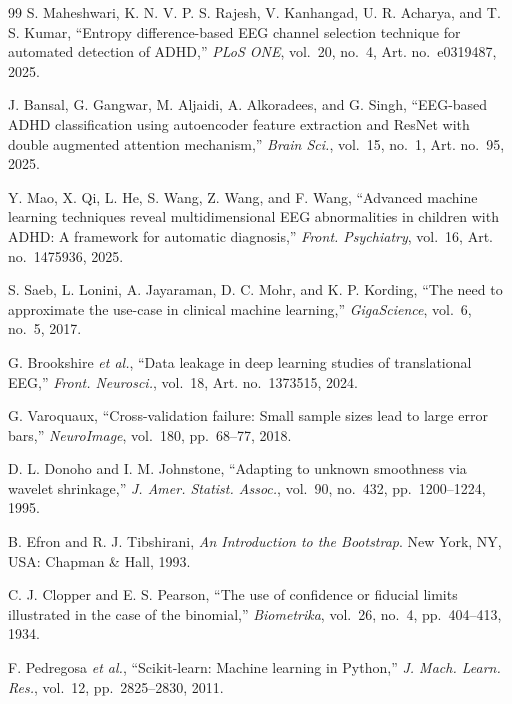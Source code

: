 \begin{thebibliography}{99}
 S. Maheshwari, K. N. V. P. S. Rajesh, V. Kanhangad, U. R. Acharya, and
T. S. Kumar, ``Entropy difference-based EEG channel selection technique for automated detection
of ADHD,'' \emph{PLoS ONE}, vol.~20, no.~4, Art. no.~e0319487, 2025.

 J. Bansal, G. Gangwar, M. Aljaidi, A. Alkoradees, and G. Singh,
``EEG-based ADHD classification using autoencoder feature extraction and ResNet with double
augmented attention mechanism,'' \emph{Brain Sci.}, vol.~15, no.~1, Art. no.~95, 2025.

 Y. Mao, X. Qi, L. He, S. Wang, Z. Wang, and F. Wang, ``Advanced machine
learning techniques reveal multidimensional EEG abnormalities in children with ADHD: A framework
for automatic diagnosis,'' \emph{Front. Psychiatry}, vol.~16, Art. no.~1475936, 2025.

 S. Saeb, L. Lonini, A. Jayaraman, D. C. Mohr, and K. P. Kording, ``The need
to approximate the use-case in clinical machine learning,'' \emph{GigaScience}, vol.~6,
no.~5, 2017.

 G. Brookshire \emph{et al.}, ``Data leakage in deep learning studies of
translational EEG,'' \emph{Front. Neurosci.}, vol.~18, Art. no.~1373515, 2024.

 G. Varoquaux, ``Cross-validation failure: Small sample sizes lead to
large error bars,'' \emph{NeuroImage}, vol.~180, pp.~68--77, 2018.

 D. L. Donoho and I. M. Johnstone, ``Adapting to unknown smoothness via
wavelet shrinkage,'' \emph{J. Amer. Statist. Assoc.}, vol.~90, no.~432, pp.~1200--1224, 1995.

 B. Efron and R. J. Tibshirani, \emph{An Introduction to the Bootstrap}.
New York, NY, USA: Chapman \& Hall, 1993.

 C. J. Clopper and E. S. Pearson, ``The use of confidence or fiducial
limits illustrated in the case of the binomial,'' \emph{Biometrika}, vol.~26, no.~4,
pp.~404--413, 1934.

 F. Pedregosa \emph{et al.}, ``Scikit-learn: Machine learning in
Python,'' \emph{J. Mach. Learn. Res.}, vol.~12, pp.~2825--2830, 2011.

\end{thebibliography}
